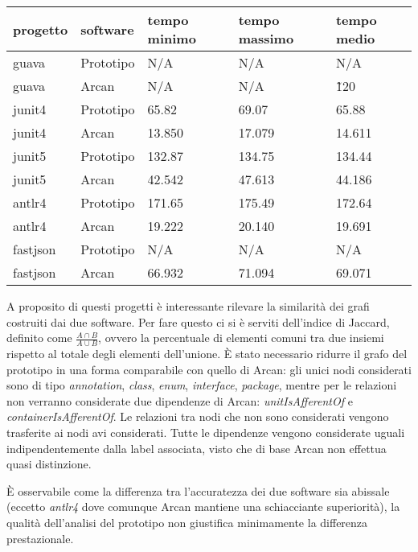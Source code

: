 \begin{center}
    \begin{tabular}{|l|l|l|l|l|}
        \hline
        progetto & software & tempo minimo & tempo massimo & tempo medio \\ \hline
        \hline
        \rowcolor[HTML]{FE0000}
        guava    & Prototipo & N/A    & N/A    & N/A    \\ \hline
        \rowcolor[HTML]{34FF34} 
        guava    & Arcan     & N/A    & N/A    & \~120   \\ \hline
        \rowcolor[HTML]{F27805} 
        junit4   & Prototipo & 65.82  & 69.07  & 65.88  \\ \hline
        \rowcolor[HTML]{34FF34} 
        junit4   & Arcan     & 13.850 & 17.079 & 14.611 \\ \hline
        \rowcolor[HTML]{F27805} 
        junit5   & Prototipo & 132.87 & 134.75 & 134.44 \\ \hline
        \rowcolor[HTML]{34FF34} 
        junit5   & Arcan     & 42.542 & 47.613 & 44.186 \\ \hline
        \rowcolor[HTML]{F27805} 
        antlr4   & Prototipo & 171.65 & 175.49 & 172.64 \\ \hline
        \rowcolor[HTML]{34FF34} 
        antlr4   & Arcan     & 19.222 & 20.140 & 19.691 \\ \hline
        \rowcolor[HTML]{FE0000} 
        fastjson & Prototipo & N/A    & N/A    & N/A    \\ \hline
        \rowcolor[HTML]{34FF34} 
        fastjson & Arcan     & 66.932 & 71.094 & 69.071 \\ \hline
    \end{tabular}
\end{center}

\begin{sloppypar}
A proposito di questi progetti \`e interessante rilevare la similarit\`a dei grafi costruiti dai due software. Per fare questo ci si \`e serviti dell'indice di Jaccard, definito come $\frac {A \cap B} {A \cup B}$, ovvero la percentuale di elementi comuni tra due insiemi rispetto al totale degli elementi dell'unione. \`E stato necessario ridurre il grafo del prototipo in una forma comparabile con quello di Arcan: gli unici nodi considerati sono di tipo \emph{annotation}, \emph{class}, \emph{enum}, \emph{interface}, \emph{package}, mentre per le relazioni non verranno considerate due dipendenze di Arcan: \emph{unitIsAfferentOf} e \emph{containerIsAfferentOf}. Le relazioni tra nodi che non sono considerati vengono trasferite ai nodi avi considerati. Tutte le dipendenze vengono considerate uguali indipendentemente dalla label associata, visto che di base Arcan non effettua quasi distinzione.
\end{sloppypar}
\`E osservabile come la differenza tra l'accuratezza dei due software sia abissale (eccetto \emph{antlr4} dove comunque Arcan mantiene una schiacciante superiorit\`a), la qualit\`a dell'analisi del prototipo non giustifica minimamente la differenza prestazionale.

